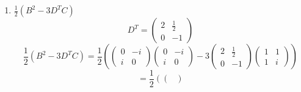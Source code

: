 \documentclass[a4paper]{article}
\theoremstyle{break}
\theoremstyle{break}
\theoremstyle{break}
\theoremstyle{break}
\begin{document}
\begin{enumerate}
\[\begin{pmatrix}
				      1 & 1 \\
				      1 & i
			      \end{pmatrix}
		      \begin{pmatrix}
				      1 & 1 \\
				      1 & i
			      \end{pmatrix} \right)
		      \begin{pmatrix}
			      i & -1  \\
			      0 & 1+i
		      \end{pmatrix}
	      \]
	      \[
		      = \begin{pmatrix}
			      2     & 1+i \\
			      1 + i & 0
		      \end{pmatrix}
		      \begin{pmatrix}
			      i & -1    \\
			      0 & 1 + i
		      \end{pmatrix}
	      \]
	      \[
		      = \begin{pmatrix}
			      2i     & -2 + 2i \\
			      -1 + i & -1 -i
		      \end{pmatrix}
	      \]
	\item[(e)] \( \frac{1}{2} \left( B^2 - 3D^TC \right)  \)
	      \[
		      D^T = \begin{pmatrix}
			      2 & \frac{1}{2} \\
			      0 & -1
		      \end{pmatrix}
	      \]
	      \[
		      \frac{1}{2} \left( B^2 - 3D^TC \right) =
		      \frac{1}{2} \left( \begin{pmatrix}
				      0 & -i \\
				      i & 0
			      \end{pmatrix}
		      \begin{pmatrix}
				      0 & -i \\
				      i & 0
			      \end{pmatrix}
		      - 3
		      \begin{pmatrix}
				      2 & \frac{1}{2} \\
				      0 & -1
			      \end{pmatrix}
		      \begin{pmatrix}
				      1 & 1 \\
				      1 & i
			      \end{pmatrix} \right)
	      \]
	      \[
		      = \frac{1}{2} \left(
		      \begin{pmatrix}

\end{pmatrix}\]
\end{enumerate}
\end{document}
